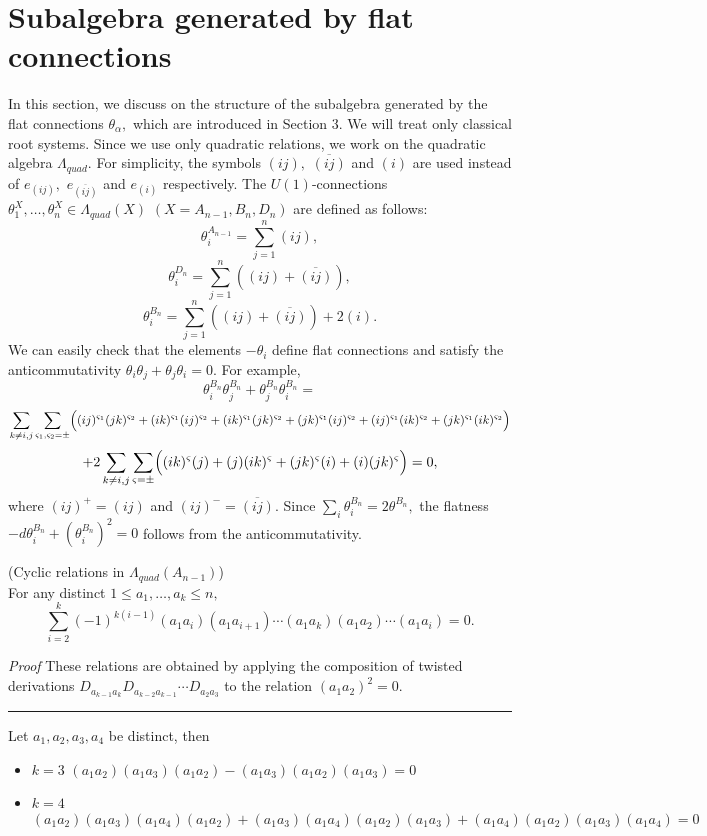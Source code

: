\section{Subalgebra generated by flat connections}
In this section, we discuss on the structure of the subalgebra 
generated by the flat connections $\theta_{\alpha},$ which are 
introduced in Section 3. We will treat only classical 
root systems. Since we use only quadratic relations, 
we work on the quadratic algebra $\Lambda_{quad}.$ 
For simplicity, the symbols $(ij),$ $\overline{(ij)}$ and 
$(i)$ are used instead of $e_{(ij)},$ $e_{\overline{(ij)}}$ 
and $e_{(i)}$ respectively. 
The $U(1)$-connections 
$\theta_1^X,\ldots,\theta_n^X \in \Lambda_{quad}(X)$ 
$(X=A_{n-1},B_n,D_n)$ 
are defined as follows: 
\[ \theta^{A_{n-1}}_i= \sum_{j=1}^n (ij), \]
\[ \theta^{D_n}_i=\sum_{j=1}^n ((ij)+\overline{(ij)}), \] 
\[ \theta^{B_n}_i=\sum_{j=1}^n ((ij)+\overline{(ij)})+
2(i). \]
We can easily check that the elements $-\theta_i$ define flat connections 
and satisfy the anticommutativity 
$\theta_i\theta_j+\theta_j\theta_i=0.$ For example, 
\[ \theta_i^{B_n}\theta_j^{B_n}+\theta_j^{B_n}\theta_i^{B_n} = \]
\[ \sum_{k\not= i,j} \sum_{\varsigma_1,\varsigma_2=\pm}
\Bigl((ij)^{\varsigma_1}(jk)^{\varsigma_2}+
(ik)^{\varsigma_1}(ij)^{\varsigma_2}+(ik)^{\varsigma_1}(jk)^{\varsigma_2}+
(jk)^{\varsigma_1}(ij)^{\varsigma_2}+(ij)^{\varsigma_1}(ik)^{\varsigma_2}+
(jk)^{\varsigma_1}(ik)^{\varsigma_2} \Bigr) \] 
\[ + 2\sum_{k\not= i,j}\sum_{\varsigma=\pm}
\Bigl( (ik)^{\varsigma}(j)+(j)(ik)^{\varsigma}+
(jk)^{\varsigma}(i)+(i)(jk)^{\varsigma} \Bigr) =0, \]
where $(ij)^+=(ij)$ and $(ij)^-=\overline{(ij)}.$ Since $\sum_i \theta_i^{B_n} 
=2\theta^{B_n},$ the flatness $-d\theta_i^{B_n}+(\theta_i^{B_n})^2=0$ follows 
from the anticommutativity. 
\begin{lem}
{\rm (Cyclic relations in $\Lambda_{quad}(A_{n-1})$)} \\ 
For any distinct $1\leq a_1,\ldots,a_k \leq n,$ 
\[ \sum_{i=2}^k (-1)^{k(i-1)} (a_1a_i)(a_1a_{i+1})\cdots 
(a_1a_k)(a_1a_2)\cdots (a_1a_i) =0. \]
\end{lem}
{\it Proof} \quad These relations are obtained by 
applying the composition of twisted derivations 
$D_{a_{k-1}a_k}D_{a_{k-2}a_{k-1}}\cdots D_{a_2a_3}$ to the 
relation $(a_1a_2)^2=0.$ \quad \rule{3mm}{3mm}
\begin{ex} {\rm 
Let $a_1,a_2,a_3,a_4$ be distinct, then 
\begin{itemize}
\item $k=3$ \hspace{10mm} 
$(a_1a_2)(a_1a_3)(a_1a_2)-(a_1a_3)(a_1a_2)(a_1a_3)=0$ 
\item $k=4$ 
\[ (a_1a_2)(a_1a_3)(a_1a_4)(a_1a_2)+(a_1a_3)(a_1a_4)(a_1a_2)
(a_1a_3)+(a_1a_4)(a_1a_2)(a_1a_3)(a_1a_4)=0 \]
\end{itemize}}
\end{ex}
